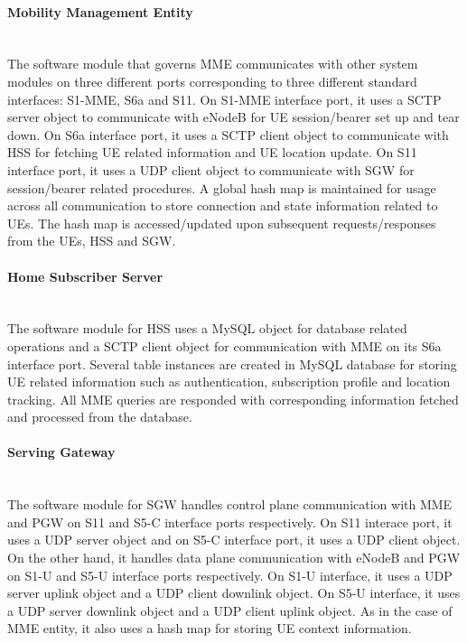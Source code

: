 \documentclass[hidelinks]{report}
\begin{document}
\paragraph*{Mobility Management Entity}

~\\ The software module that governs MME communicates with other system modules on three different ports corresponding to three different standard interfaces: S1-MME, S6a and S11. On S1-MME interface port, it uses a SCTP server object to communicate with eNodeB for UE session/bearer set up and tear down. On S6a interface port, it uses a SCTP client object to communicate with HSS for fetching UE related information and UE location update. On S11 interface port, it uses a UDP client object to communicate with SGW for session/bearer related procedures. A global hash map is maintained for usage across all communication to store connection and state information related to UEs. The hash map is accessed/updated upon subsequent requests/responses from the UEs, HSS and SGW.

\paragraph*{Home Subscriber Server}

~\\ The software module for HSS uses a MySQL object for database related operations and a SCTP client object for communication with MME on its S6a interface port. Several table instances are created in MySQL database for storing UE related information such as authentication,  subscription profile and location tracking. All MME queries are responded with corresponding information fetched and processed from the database.

\paragraph*{Serving Gateway}

~\\ The software module for SGW handles control plane communication with MME and PGW on S11 and S5-C interface ports respectively. On S11 interace port, it uses a UDP server object and on S5-C interface port, it uses a UDP client object. On the other hand, it handles data plane communication with eNodeB and PGW on S1-U and S5-U interface ports respectively. On S1-U interface, it uses a UDP server uplink object and a UDP client downlink object. On S5-U interface, it uses a UDP server downlink object and a UDP client uplink object. As in the case of MME entity, it also uses a hash map for storing UE context information.
\end{document}
